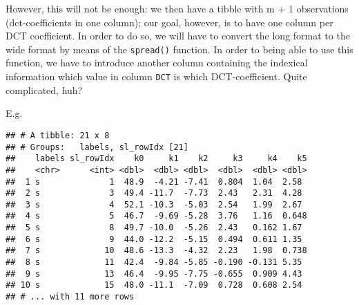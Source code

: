 \documentclass[
]{book}
\newenvironment{Shaded}{\begin{snugshade}}{\end{snugshade}}
\newcommand{\AttributeTok}[1]{\textcolor[rgb]{0.77,0.63,0.00}{#1}}
\newcommand{\CommentTok}[1]{\textcolor[rgb]{0.56,0.35,0.01}{\textit{#1}}}
\newcommand{\DecValTok}[1]{\textcolor[rgb]{0.00,0.00,0.81}{#1}}
\newcommand{\FunctionTok}[1]{\textcolor[rgb]{0.00,0.00,0.00}{#1}}
\newcommand{\NormalTok}[1]{#1}
\newcommand{\OtherTok}[1]{\textcolor[rgb]{0.56,0.35,0.01}{#1}}
\newcommand{\SpecialCharTok}[1]{\textcolor[rgb]{0.00,0.00,0.00}{#1}}
\newcommand{\StringTok}[1]{\textcolor[rgb]{0.31,0.60,0.02}{#1}}
\begin{document}
However, this will not be enough: we then have a tibble with m + 1 observations (dct-coefficients in one column); our goal, however, is to have one column per DCT coefficient. In order to do so, we will have to convert the long format to the wide format by means of the \texttt{spread()} function. In order to being able to use this function, we have to introduce another column containing the indexical information which value in column \texttt{DCT} is which DCT-coefficient. Quite complicated, huh?

E.g.

\begin{Shaded}
\end{Shaded}

\begin{verbatim}
## # A tibble: 21 x 8
## # Groups:   labels, sl_rowIdx [21]
##    labels sl_rowIdx    k0     k1    k2     k3     k4    k5
##    <chr>      <int> <dbl>  <dbl> <dbl>  <dbl>  <dbl> <dbl>
##  1 s              1  48.9  -4.21 -7.41  0.804  1.04  2.58 
##  2 s              3  49.4 -11.7  -7.73  2.43   2.31  4.28 
##  3 s              4  52.1 -10.3  -5.03  2.54   1.99  2.67 
##  4 s              5  46.7  -9.69 -5.28  3.76   1.16  0.648
##  5 s              8  49.7 -10.0  -5.26  2.43   0.162 1.67 
##  6 s              9  44.0 -12.2  -5.15  0.494  0.611 1.35 
##  7 s             10  48.6 -13.3  -4.32  2.23   1.98  0.738
##  8 s             11  42.4  -9.84 -5.85 -0.190 -0.131 5.35 
##  9 s             13  46.4  -9.95 -7.75 -0.655  0.909 4.43 
## 10 s             15  48.0 -11.1  -7.09  0.728  0.608 2.54 
## # ... with 11 more rows
\end{verbatim}
\end{document}
